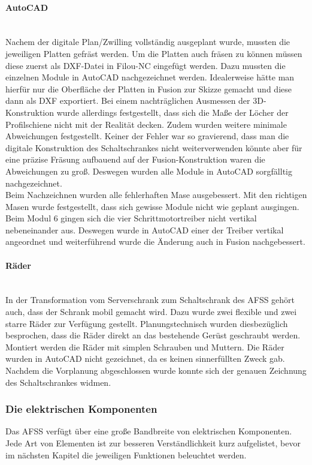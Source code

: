     \paragraph{AutoCAD}\mbox{}\\
    \label{AutoCAD}
    Nachem der digitale Plan/Zwilling vollständig ausgeplant wurde, mussten die jeweiligen Platten gefräst werden. Um die Platten auch fräsen zu können müssen diese zuerst als DXF-Datei in Filou-NC eingefügt werden. Dazu mussten die einzelnen Module in AutoCAD nachgezeichnet werden. Idealerweise hätte man hierfür nur die Oberfläche der Platten in Fusion zur Skizze gemacht und diese dann als DXF exportiert. Bei einem nachträglichen Ausmessen der 3D-Konstruktion wurde allerdings festgestellt, dass sich die Maße der Löcher der Profilschiene nicht mit der Realität decken. Zudem wurden weitere minimale Abweichungen festgestellt. Keiner der Fehler war so gravierend, dass man die digitale Konstruktion des Schaltschrankes nicht weiterverwenden könnte aber für eine präzise Fräsung aufbauend auf der Fusion-Konstruktion waren die Abweichungen zu groß. Deswegen wurden alle Module in AutoCAD sorgfälltig nachgezeichnet.\\     
    Beim Nachzeichnen wurden alle fehlerhaften Mase ausgebessert. Mit den richtigen Masen wurde festgestellt, dass sich gewisse Module nicht wie geplant ausgingen. Beim Modul 6 gingen sich die vier Schrittmotortreiber nicht vertikal nebeneinander aus. Deswegen wurde in AutoCAD einer der Treiber vertikal angeordnet und weiterführend wurde die Änderung auch in Fusion nachgebessert.
    \paragraph{Räder}\mbox{}\\
    In der Transformation vom Serverschrank zum Schaltschrank des AFSS gehört auch, dass der Schrank mobil gemacht wird. Dazu wurde zwei flexible und zwei starre Räder zur Verfügung gestellt. Planungstechnisch wurden diesbezüglich besprochen, dass die Räder direkt an das bestehende Gerüst geschraubt werden. Montiert werden die Räder mit simplen Schrauben und Muttern. Die Räder wurden in AutoCAD nicht gezeichnet, da es keinen sinnerfüllten Zweck gab.\\
    Nachdem die Vorplanung abgeschlossen wurde konnte sich der genauen Zeichnung des Schaltschrankes widmen.
    \newpage
\subsubsection{Die elektrischen Komponenten}
\label{sec:Die elektrischen Komponenten}
    Das AFSS verfügt über eine große  Bandbreite von elektrischen Komponenten. Jede Art von Elementen ist zur besseren Verständlichkeit kurz aufgelistet, bevor im nächsten Kapitel die jeweiligen Funktionen beleuchtet werden.
